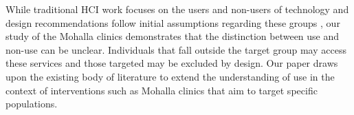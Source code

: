 While traditional HCI work focuses on the users and non-users of technology and design recommendations follow initial assumptions regarding these groups \cite{?}, our study of the Mohalla clinics demonstrates that the distinction between use and non-use can be unclear. Individuals that fall outside the target group may access these services \cite{baumer2015usees} and those targeted may be excluded by design. Our paper draws upon the existing body of literature to extend the understanding of use in the context of interventions such as Mohalla clinics that aim to target specific populations.

\begin{comment}

Case study of mohalla clinics - who gets benefits, who doesn’t? Who are the stakeholders - diff groups? Targeting the poorest of the poor - articles: toi, etc

2: While designing - how do we look at use? And whether the use is exclusive - possible? 
Geographical locations: high socio-economic gap - same geographical location - harder to segregate - urban - How do we ensure services are accessed by poor

3: Case study of clinics - overview
We present a case study of two neighborhood clinics or 'Mohalla clinics' set up by the government in the same geographical location. 

4: What is the paper about?
In this paper, we examine _ and the ethical(?) implications of designing for a particular set of users.
\end{comment}